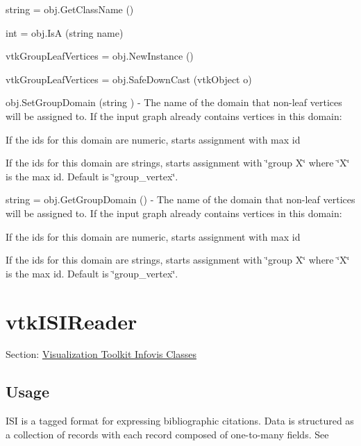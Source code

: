 \begin{DoxyItemize}
\item {\ttfamily string = obj.\-Get\-Class\-Name ()}  
\item {\ttfamily int = obj.\-Is\-A (string name)}  
\item {\ttfamily vtk\-Group\-Leaf\-Vertices = obj.\-New\-Instance ()}  
\item {\ttfamily vtk\-Group\-Leaf\-Vertices = obj.\-Safe\-Down\-Cast (vtk\-Object o)}  
\item {\ttfamily obj.\-Set\-Group\-Domain (string )} -\/ The name of the domain that non-\/leaf vertices will be assigned to. If the input graph already contains vertices in this domain\-:
\begin{DoxyItemize}
\item If the ids for this domain are numeric, starts assignment with max id
\item If the ids for this domain are strings, starts assignment with \char`\"{}group X\char`\"{} where \char`\"{}\-X\char`\"{} is the max id. Default is \char`\"{}group\-\_\-vertex\char`\"{}.  
\end{DoxyItemize}
\item {\ttfamily string = obj.\-Get\-Group\-Domain ()} -\/ The name of the domain that non-\/leaf vertices will be assigned to. If the input graph already contains vertices in this domain\-:
\begin{DoxyItemize}
\item If the ids for this domain are numeric, starts assignment with max id
\item If the ids for this domain are strings, starts assignment with \char`\"{}group X\char`\"{} where \char`\"{}\-X\char`\"{} is the max id. Default is \char`\"{}group\-\_\-vertex\char`\"{}.  
\end{DoxyItemize}
\end{DoxyItemize}\hypertarget{vtkinfovis_vtkisireader}{}\section{vtk\-I\-S\-I\-Reader}\label{vtkinfovis_vtkisireader}
Section\-: \hyperlink{sec_vtkinfovis}{Visualization Toolkit Infovis Classes} \hypertarget{vtkwidgets_vtkxyplotwidget_Usage}{}\subsection{Usage}\label{vtkwidgets_vtkxyplotwidget_Usage}
I\-S\-I is a tagged format for expressing bibliographic citations. Data is structured as a collection of records with each record composed of one-\/to-\/many fields. See

